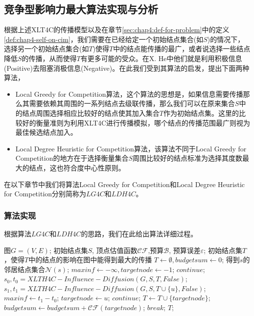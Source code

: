 \subsection{竞争型影响力最大算法实现与分析}
根据上述XLT4C的传播模型以及在章节\ref{sec:chap4:def-for-problem}中的定义\ref{def:chap4-self-on-cim}，我们需要在已经给定一个初始结点集合(如$S$)的情况下，选择另一个初始结点集合(如$T$)使得$T$中的结点能传播的最广，或者说选择一些结点降低$S$的传播，从而使得$T$有更多可能的受众。在X. He\cite{he2012influence}中他们就是利用积极信息(Positive)去阻塞消极信息(Negative)。在此我们受到其算法的启发，提出下面两种算法，
\begin{itemize}
\item Local Greedy for Competition算法，这个算法的思想是，如果信息需要传播那么其需要依赖其周围的一系列结点去级联传播，那么我们可以在原来集合$S$中的结点周围选择相应比较好的结点使其加入集合$T$作为初始结点集。这里的比较好的衡量准则为利用XLT4C进行传播模拟，哪个结点的传播范围最广则视为最佳候选结点加入。
\item Local Degree Heuristic for Competition算法，该算法不同于Local Greedy for Competition的地方在于选择衡量集合$S$周围比较好的结点标准为选择其度数最大的结点，这也符合度中心性原则\cite{bonacich1972factoring}。
\end{itemize}

在以下章节中我们将算法Local Greedy for Competition和Local Degree Heuristic for Competition分别简称为$LG4C$和$LDH4C$。

\subsubsection{算法实现}
根据算法$LG4C$和$LDH4C$的思路，我们在此给出算法详细过程。
\begin{algorithm}[H]
	\caption{$LG4C(G, S, \mathcal{CF}, \mathcal{B})$}
	\label{alg:chap4:lg4c-proc}
	\begin{algorithmic}[1]
	\REQUIRE 图$G=(V,E)$; 初始结点集$S$, 顶点估值函数$\mathcal{CF}$,预算$\mathcal{B}$, 预算误差$\varepsilon$;
	\ENSURE 初始结点集$T$，使得$T$中的结点的影响在图中能得到最大的传播
		\STATE $T \leftarrow \emptyset, budgetsum \leftarrow 0$;
			\STATE 得到$s$的邻居结点集合$\mathcal{N}(s)$;
			\STATE $maxinf \leftarrow -\infty,targetnode \leftarrow -1$;
					\STATE $continue$;
				\ENDIF
				\STATE $s_0, t_0 = XLTH4C-Influence-Diffusion(G, S, T, False)$;
				\STATE $s_1, t_1 = XLTH4C-Influence-Diffusion(G, S, T \cup \{u\}, False)$;
					\STATE $maxinf \leftarrow t_1 - t_0$;
					\STATE $targetnode \leftarrow u$;
				\ENDIF
			\ENDFOR
				\STATE $continue$;
			\ENDIF
			\STATE $T \leftarrow T \cup \{targetnode\}$;
			\STATE $budgetsum \leftarrow budgetsum + \mathcal{CF}(targetnode)$;
				\STATE $break$;
			\ENDIF
		\ENDFOR
		\RETURN $T$;
	\end{algorithmic}
\end{algorithm}



